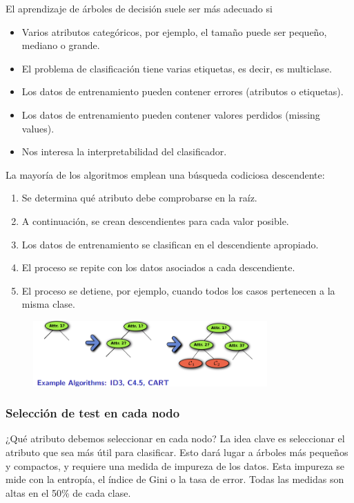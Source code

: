 El aprendizaje de árboles de decisión suele ser más adecuado si
\begin{itemize}
\item Varios atributos categóricos, por ejemplo, el tamaño puede ser pequeño, mediano o grande.
\item El problema de clasificación tiene varias etiquetas, es decir, es multiclase.
\item Los datos de entrenamiento pueden contener errores (atributos o etiquetas).
\item Los datos de entrenamiento pueden contener valores perdidos (missing values).
\item Nos interesa la interpretabilidad del clasificador.
\end{itemize}

La mayoría de los algoritmos emplean una búsqueda codiciosa descendente:
\begin{enumerate}
\item Se determina qué atributo debe comprobarse en la raíz.
\item A continuación, se crean descendientes para cada valor posible.
\item Los datos de entrenamiento se clasifican en el descendiente apropiado.
\item El proceso se repite con los datos asociados a cada descendiente.
\item El proceso se detiene, por ejemplo, cuando todos los casos pertenecen a la misma clase.
\end{enumerate}

\begin{figure}[h]
\centering
\includegraphics[width = 0.8\textwidth]{figs/tree-construction.png}
\end{figure}

\subsubsection{Selección de test en cada nodo}
¿Qué atributo debemos seleccionar en cada nodo? La idea clave es seleccionar el atributo que sea más útil para clasificar. Esto dará lugar a árboles más pequeños y compactos, y requiere una medida de impureza de los datos. Esta impureza se mide con la entropía, el índice de Gini o la tasa de error. Todas las medidas son altas en el 50\% de cada clase.

